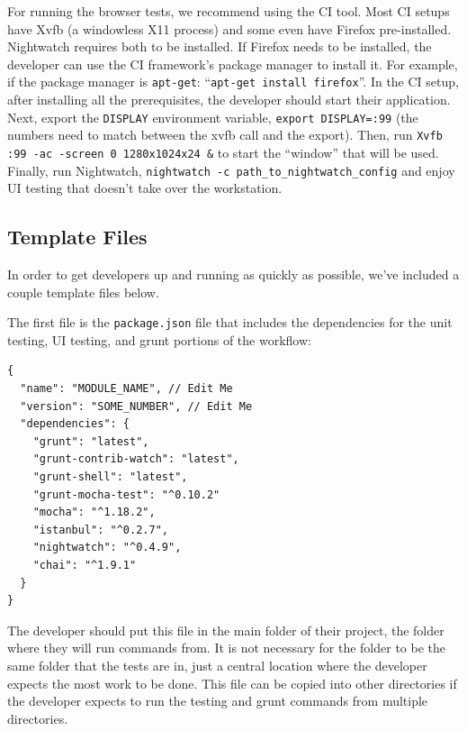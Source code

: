 \documentclass[12pt]{ucthesis}
\begin{document}
For running the browser tests, we recommend using the CI tool. Most CI setups have Xvfb (a windowless X11 process) and some even have Firefox pre-installed. Nightwatch requires both to be installed. If Firefox needs to be installed, the developer can use the CI framework's package manager to install it. For example, if the package manager is \lstinline{apt-get}: ``\lstinline{apt-get install firefox}''. In the CI setup, after installing all the prerequisites, the developer should start their application. Next, export the \lstinline{DISPLAY} environment variable, \lstinline{export DISPLAY=:99} (the numbers need to match between the xvfb call and the export). Then, run \lstinline{Xvfb :99 -ac -screen 0 1280x1024x24 &} to start the ``window'' that will be used. Finally, run Nightwatch, \lstinline{nightwatch -c path_to_nightwatch_config} and enjoy UI testing that doesn't take over the workstation.

\subsection{Template Files}
In order to get developers up and running as quickly as possible, we've included a couple template files below.

The first file is the \lstinline{package.json} file that includes the dependencies for the unit testing, UI testing, and grunt portions of the workflow:
\begin{lstlisting}
{
  "name": "MODULE_NAME", // Edit Me
  "version": "SOME_NUMBER", // Edit Me
  "dependencies": {
    "grunt": "latest",
    "grunt-contrib-watch": "latest",
    "grunt-shell": "latest",
    "grunt-mocha-test": "^0.10.2"
    "mocha": "^1.18.2",
    "istanbul": "^0.2.7",
    "nightwatch": "^0.4.9",
    "chai": "^1.9.1"
  }
}
\end{lstlisting}
The developer should put this file in the main folder of their project, the folder where they will run commands from. It is not necessary for the folder to be the same folder that the tests are in, just a central location where the developer expects the most work to be done. This file can be copied into other directories if the developer expects to run the testing and grunt commands from multiple directories.
\end{document}
